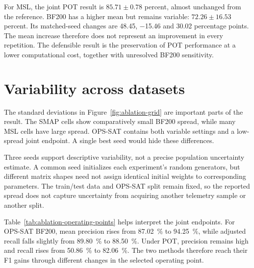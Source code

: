 For \ac{MSL}, the joint \ac{POT} result is
\(\num{85.71}\pm\num{0.78}\) percent, almost unchanged from the
reference. BF200 has a higher mean but remains variable:
\(\num{72.26}\pm\num{16.53}\) percent. Its matched-seed changes
are \num{+48.45}, \num{-15.46} and \num{+30.02} percentage points.
The mean increase therefore does not represent an improvement in every
repetition. The defensible result is the preservation of \ac{POT}
performance at a lower computational cost, together with unresolved
BF200 sensitivity.

\section{Variability across datasets}
\label{sec:ablation-variability}
The standard deviations in Figure~\ref{fig:ablation-grid} are important
parts of the result. The \ac{SMAP} cells show comparatively small BF200
spread, while many \ac{MSL} cells have large spread. \ac{OPS-SAT}
contains both variable settings and a low-spread joint endpoint. A single
best seed would hide these differences.

Three seeds support descriptive variability, not a precise population
uncertainty estimate. A common seed initializes each experiment's random
generators, but different matrix shapes need not assign identical initial
weights to corresponding parameters. The train/test data and
\ac{OPS-SAT} split remain fixed, so the reported spread does not capture
uncertainty from acquiring another telemetry sample or another split.

Table~\ref{tab:ablation-operating-points} helps interpret the joint
endpoints. For \ac{OPS-SAT} BF200, mean precision rises from
\SI{87.02}{\percent} to \SI{94.25}{\percent}, while adjusted recall
falls slightly from \SI{89.80}{\percent} to \SI{88.50}{\percent}.
Under \ac{POT}, precision remains high and recall rises from
\SI{50.86}{\percent} to \SI{82.06}{\percent}.
The two methods therefore reach their F1 gains through different changes
in the selected operating point.

\begin{table}[htbp]
  \centering
  \small
  \setlength{\tabcolsep}{6pt}
  
  \caption{Reference and joint-endpoint operating points. Entries are
  mean \(\pm\) sample standard deviation across \num{3} seeds, in percent.
  Each method retains the alpha and threshold selected for its own F1.
  AUC-PA uses the resulting adjusted binary predictions.}
  \label{tab:ablation-operating-points}
\end{table}

